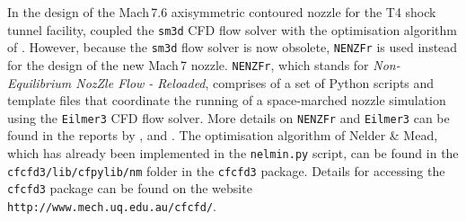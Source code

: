 \documentclass[12pt,a4paper]{article}
\begin{document}
In the design of the Mach\,7.6 axisymmetric contoured nozzle for the T4 shock 
tunnel facility,  coupled the \texttt{sm3d} CFD flow
solver with the optimisation algorithm of . However, 
because the \texttt{sm3d} flow solver is now obsolete, \texttt{NENZFr} is used 
instead for the design of the new Mach\,7 nozzle. \texttt{NENZFr}, which stands
for \textit{Non-Equilibrium NozZle Flow - Reloaded}, comprises of a set of 
Python scripts and template files that coordinate the running of a space-marched 
nozzle simulation using the \texttt{Eilmer3} CFD flow solver. More details on 
\texttt{NENZFr} and \texttt{Eilmer3} can be found in the reports by 
,  and . 
The optimisation algorithm of Nelder \& Mead, which has already been implemented 
in the \texttt{nelmin.py} script, can be found in the \texttt{cfcfd3/lib/cfpylib/nm} 
folder in the \texttt{cfcfd3} package. Details for accessing the \texttt{cfcfd3} 
package can be found on the website \texttt{http://www.mech.uq.edu.au/cfcfd/}.
\end{document}
